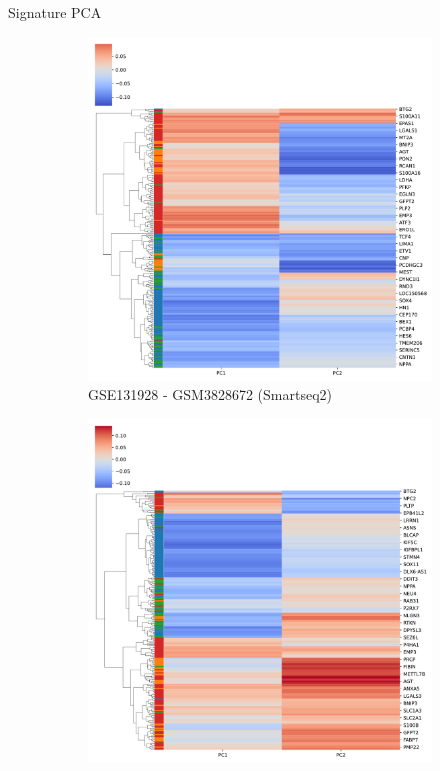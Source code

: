 \documentclass[aspectratio=169,9pt]{beamer}
\begin{document}
    \begin{frame}{Signature PCA}
        \begin{adjustwidth}{-5cm}{-5cm}
            \centering
            \begin{figure}
                \centering
                \begin{subfigure}[b]{0.38\textwidth}
                    \centering
                    \includegraphics[width=\textwidth]{GSM3828672_loadings_plot}
                    \caption{GSE131928 - GSM3828672 (Smartseq2)}
                \end{subfigure}
                \begin{subfigure}[b]{0.38\textwidth}
                    \centering
                    \includegraphics[width=\textwidth]{GSM3828673_loadings_plot}

\end{subfigure}
\end{figure}
\end{adjustwidth}
\end{frame}
\end{document}
